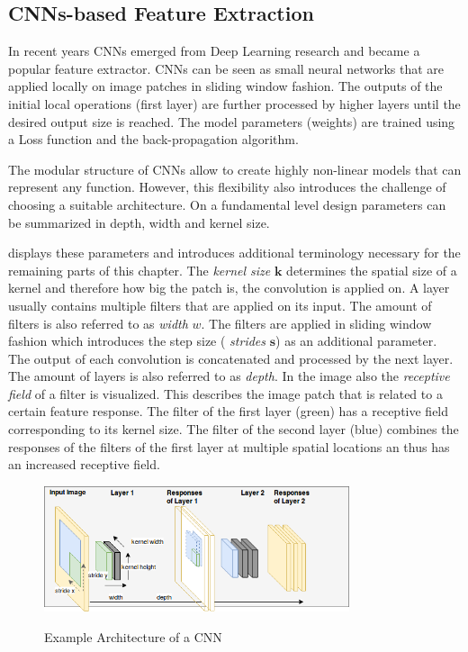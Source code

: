 
\subsection{\acp{CNN}-based Feature Extraction}

In recent years \acp{CNN} emerged from Deep Learning research and became a popular feature extractor. \acp{CNN} can be seen as small neural networks that are applied locally on image patches in sliding window fashion. The outputs of the initial local operations (first layer) are further processed by higher layers until the desired output size is reached. The model parameters (weights) are trained using a Loss function and the back-propagation algorithm.

The modular structure of \acp{CNN} allow to create highly non-linear models that can represent any function. However, this flexibility also introduces the challenge of choosing a suitable architecture. On a fundamental level design parameters can be summarized in depth, width and kernel size. 

 displays these parameters and introduces additional terminology necessary for the remaining parts of this chapter. The \textit{kernel size} $\textbf{k}$ determines the spatial size of a kernel and therefore how big the patch is, the convolution is applied on. A layer usually contains multiple filters that are applied on its input. The amount of filters is also referred to as \textit{width} $w$. The filters are applied in sliding window fashion which introduces the step size ( \textit{strides} $\mathbf{s}$) as an additional parameter. The output of each convolution is concatenated and processed by the next layer. The amount of layers is also referred to as \textit{depth}. In the image also the \textit{receptive field} of a filter is visualized. This describes the image patch that is related to a certain feature response. The filter of the first layer (green) has a receptive field corresponding to its kernel size. The filter of the second layer (blue) combines the responses of the filters of the first layer at multiple spatial locations an thus has an increased receptive field.

\begin{figure}[hbtp]
	\centering
	\includegraphics[width=0.8\textwidth]{fig/model_design}
	\label{fig:model_design}
	\caption{Example Architecture of a \ac{CNN}}
\end{figure}

